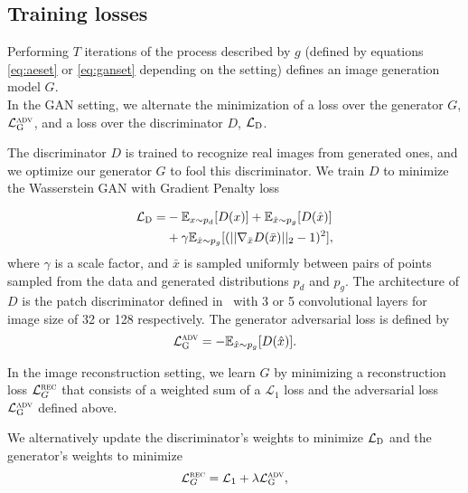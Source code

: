 \documentclass[10pt,twocolumn,letterpaper]{article}
\begin{document}
\subsection{Training losses}
Performing $T$ iterations of the process described by $g$ (defined by equations \ref{eq:aeset} or \ref{eq:ganset} depending on the setting) defines an image generation model $G$.\\

In the GAN setting, we alternate the minimization of a loss over the generator $G$, $\mathcal{L}^{\textsc{adv}}_\textsc{G}$, and a loss over the discriminator $D$, $\mathcal{L}_\textsc{D}$.     

The discriminator $D$ is trained to recognize real images from generated ones, and we optimize our generator $G$ to fool this discriminator. We train $D$ to minimize the Wasserstein GAN with Gradient Penalty loss~\cite{gulrajani2017improved}

\begin{equation} \label{eq:disc_loss}
\begin{split}
\mathcal{L}_\textsc{D} =& -\mathbb{E}_{x \sim p_{d}}[D(x)] + \mathbb{E}_{\hat{x} \sim p_{g}}[D(\hat{x})]  \\
& + \gamma\mathbb{E}_{\hat{x} \sim p_{g}}[(||\nabla_{\bar{x}} D(\bar{x})||_2 - 1)^2],
\end{split}
\end{equation}
where $\gamma$ is a scale factor, and $\bar{x}$ is sampled uniformly between pairs of points sampled from the data and generated distributions $p_d$ and $p_g$.
The architecture of $D$ is the patch discriminator defined in~\cite{Isola2016ImageToImage} with 3 or 5 convolutional layers for image size of 32 or 128 respectively.
The generator adversarial loss is defined by
\begin{equation} \label{eq:gen_wgan_loss}
    \mathcal{L}^{\textsc{adv}}_\textsc{G}=-\mathbb{E}_{\hat{x} \sim p_{g}}[D(\hat{x})].
\end{equation}

In the image reconstruction setting, we learn $G$ by minimizing a reconstruction loss $\mathcal{L}^{\textsc{rec}}_G$ that consists of a weighted sum of a $\mathcal{L}_1$ loss and the adversarial loss $\mathcal{L}^{\textsc{adv}}_\textsc{G}$ defined above. 

We alternatively update the discriminator's weights to minimize $\mathcal{L}_\textsc{D}$ and the 
generator's weights to minimize
\begin{equation} \mathcal{L}^{\textsc{rec}}_G = \mathcal{L}_1 + \lambda \mathcal{L}^{\textsc{adv}}_\textsc{G},
\end{equation}
\end{document}
